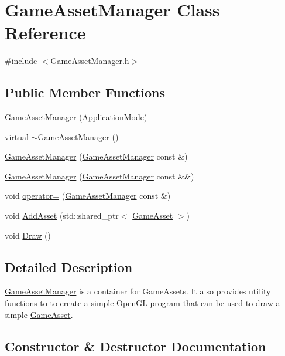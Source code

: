 \hypertarget{classGameAssetManager}{}\section{Game\+Asset\+Manager Class Reference}
\label{classGameAssetManager}


{\ttfamily \#include $<$Game\+Asset\+Manager.\+h$>$}

\subsection*{Public Member Functions}
\begin{DoxyCompactItemize}
\item 
\hyperlink{classGameAssetManager_aaa0d58e276cc10ad91a7457085598a71}{Game\+Asset\+Manager} (Application\+Mode)
\item 
virtual \hyperlink{classGameAssetManager_a1270bd61ecbcca563f079803e40c9b77}{$\sim$\+Game\+Asset\+Manager} ()
\item 
\hyperlink{classGameAssetManager_a2c9adcb72faa154c87eadc9bafe5269d}{Game\+Asset\+Manager} (\hyperlink{classGameAssetManager}{Game\+Asset\+Manager} const \&)
\item 
\hyperlink{classGameAssetManager_a44f6e2fd6b8ff1dd64e5697f1be7386d}{Game\+Asset\+Manager} (\hyperlink{classGameAssetManager}{Game\+Asset\+Manager} const \&\&)
\item 
void \hyperlink{classGameAssetManager_ac72678a4ad5378c685aa6bae84a4e712}{operator=} (\hyperlink{classGameAssetManager}{Game\+Asset\+Manager} const \&)
\item 
void \hyperlink{classGameAssetManager_ad3de8ff00d55ba04728b1de8213b2349}{Add\+Asset} (std\+::shared\+\_\+ptr$<$ \hyperlink{classGameAsset}{Game\+Asset} $>$)
\item 
void \hyperlink{classGameAssetManager_a32837132bd70a9a9ed537323c2d3d886}{Draw} ()
\end{DoxyCompactItemize}


\subsection{Detailed Description}
\hyperlink{classGameAssetManager}{Game\+Asset\+Manager} is a container for Game\+Assets. It also provides utility functions to to create a simple Open\+GL program that can be used to draw a simple \hyperlink{classGameAsset}{Game\+Asset}. 

\subsection{Constructor \& Destructor Documentation}
\mbox{\label{classGameAssetManager_aaa0d58e276cc10ad91a7457085598a71}} 
